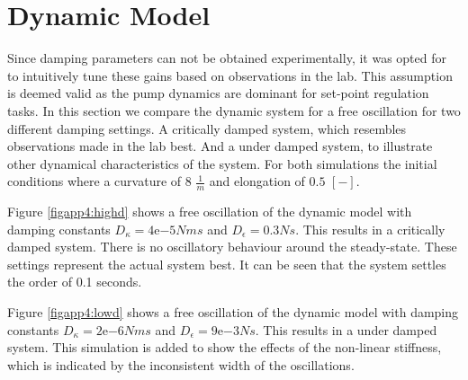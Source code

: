 \label{app4}


\section{Dynamic Model}

Since damping parameters can not be obtained experimentally, it was opted for to intuitively tune these gains based on observations in the lab. This assumption is deemed valid as the pump dynamics are dominant for set-point regulation tasks. In this section we compare the dynamic system for a free oscillation for two different damping settings. A critically damped system, which resembles observations made in the lab best. And a under damped system, to illustrate other dynamical characteristics of the system. For both simulations the initial conditions where a curvature of $8$ $\frac{1}{m}$ and elongation of $0.5$ $[-]$.


Figure \ref{figapp4:highd} shows a free oscillation of the dynamic model with damping constants $D_\kappa = 4\mathrm{e}{-5} Nms$ and $D_\epsilon = 0.3 Ns $. This results in a critically damped system. There is no oscillatory behaviour around the steady-state. These settings represent the actual system best. It can be seen that the system settles the order of 0.1 seconds.

Figure \ref{figapp4:lowd} shows a free oscillation of the dynamic model with damping constants $D_\kappa = 2\mathrm{e}{-6} Nms$ and $D_\epsilon = 9\mathrm{e}{-3} Ns $. This results in a under damped system. This simulation is added to show the effects of the non-linear stiffness, which is indicated by the inconsistent width of the oscillations.

